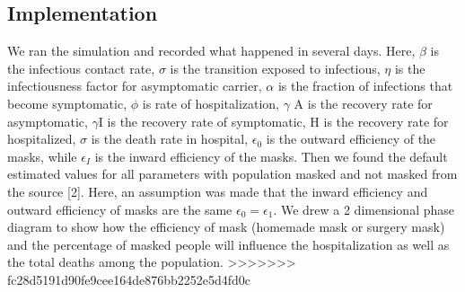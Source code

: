 \documentclass{article}
\begin{document}
\subsection{Implementation}

We ran the simulation and recorded what happened in several days. Here, $\beta$ is the infectious contact rate, $\sigma$ is the transition exposed to infectious, $\eta$ is the infectiousness factor for asymptomatic carrier, $\alpha$ is the fraction of infections that become symptomatic, $\phi$ is rate of hospitalization, $\gamma$ A is the recovery rate for asymptomatic, $\gamma$I is the recovery rate of  symptomatic, H is the recovery rate for hospitalized, $\sigma$ is the death rate in hospital, $\epsilon_{0}$ is the outward efficiency of the masks, while $\epsilon_{I}$ is the inward efficiency of the masks.
Then we found the default estimated values for all parameters with population masked and not masked from the source [2]. Here, an assumption was made that the inward efficiency and outward efficiency of masks are the same $\epsilon_{0} = \epsilon_{1}$. We drew a 2 dimensional phase diagram to show how the efficiency of mask (homemade mask or surgery mask) and the percentage of masked people will influence the hospitalization as well as the total deaths among the population.
>>>>>>> fc28d5191d90fe9cee164de876bb2252e5d4fd0c
\end{document}

